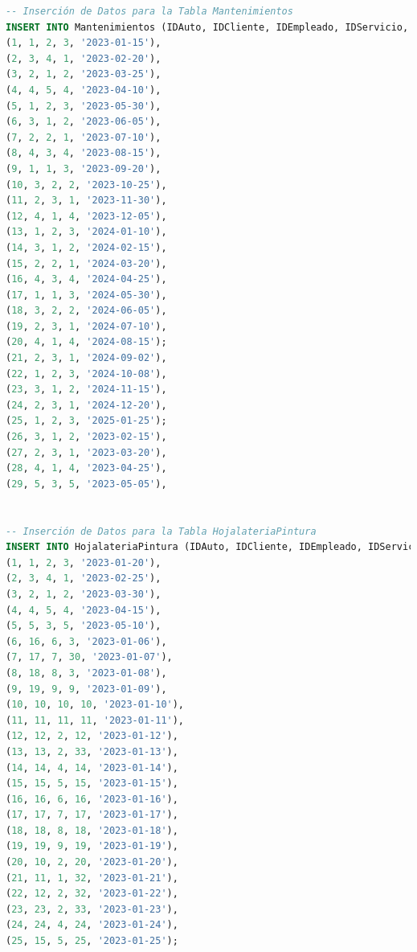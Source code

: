 \documentclass[12pt]{article}
\begin{document}
\begin{lstlisting}[language=SQL]
-- Inserción de Datos para la Tabla Mantenimientos
INSERT INTO Mantenimientos (IDAuto, IDCliente, IDEmpleado, IDServicio, FechaMantenimiento) VALUES
(1, 1, 2, 3, '2023-01-15'),
(2, 3, 4, 1, '2023-02-20'),
(3, 2, 1, 2, '2023-03-25'),
(4, 4, 5, 4, '2023-04-10'),
(5, 1, 2, 3, '2023-05-30'),
(6, 3, 1, 2, '2023-06-05'),
(7, 2, 2, 1, '2023-07-10'),
(8, 4, 3, 4, '2023-08-15'),
(9, 1, 1, 3, '2023-09-20'),
(10, 3, 2, 2, '2023-10-25'),
(11, 2, 3, 1, '2023-11-30'),
(12, 4, 1, 4, '2023-12-05'),
(13, 1, 2, 3, '2024-01-10'),
(14, 3, 1, 2, '2024-02-15'),
(15, 2, 2, 1, '2024-03-20'),
(16, 4, 3, 4, '2024-04-25'),
(17, 1, 1, 3, '2024-05-30'),
(18, 3, 2, 2, '2024-06-05'),
(19, 2, 3, 1, '2024-07-10'),
(20, 4, 1, 4, '2024-08-15');
(21, 2, 3, 1, '2024-09-02'),
(22, 1, 2, 3, '2024-10-08'),
(23, 3, 1, 2, '2024-11-15'),
(24, 2, 3, 1, '2024-12-20'),
(25, 1, 2, 3, '2025-01-25');
(26, 3, 1, 2, '2023-02-15'),
(27, 2, 3, 1, '2023-03-20'),
(28, 4, 1, 4, '2023-04-25'),
(29, 5, 3, 5, '2023-05-05'),


-- Inserción de Datos para la Tabla HojalateriaPintura
INSERT INTO HojalateriaPintura (IDAuto, IDCliente, IDEmpleado, IDServicio, FechaHojalateriaPintura) VALUES
(1, 1, 2, 3, '2023-01-20'),
(2, 3, 4, 1, '2023-02-25'),
(3, 2, 1, 2, '2023-03-30'),
(4, 4, 5, 4, '2023-04-15'),
(5, 5, 3, 5, '2023-05-10'),
(6, 16, 6, 3, '2023-01-06'),
(7, 17, 7, 30, '2023-01-07'),
(8, 18, 8, 3, '2023-01-08'),
(9, 19, 9, 9, '2023-01-09'),
(10, 10, 10, 10, '2023-01-10'),
(11, 11, 11, 11, '2023-01-11'),
(12, 12, 2, 12, '2023-01-12'),
(13, 13, 2, 33, '2023-01-13'),
(14, 14, 4, 14, '2023-01-14'),
(15, 15, 5, 15, '2023-01-15'),
(16, 16, 6, 16, '2023-01-16'),
(17, 17, 7, 17, '2023-01-17'),
(18, 18, 8, 18, '2023-01-18'),
(19, 19, 9, 19, '2023-01-19'),
(20, 10, 2, 20, '2023-01-20'),
(21, 11, 1, 32, '2023-01-21'),
(22, 12, 2, 32, '2023-01-22'),
(23, 23, 2, 33, '2023-01-23'),
(24, 24, 4, 24, '2023-01-24'),
(25, 15, 5, 25, '2023-01-25');


\end{lstlisting}
\end{document}
